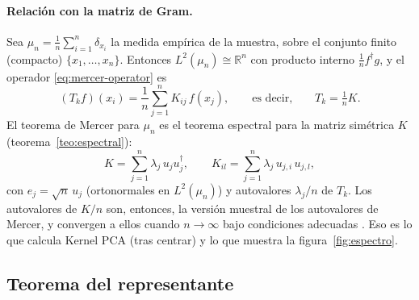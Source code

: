 \documentclass[11pt,a4paper]{article}
\newcommand{\R}{\mathbb{R}}
\newcommand{\dg}{\dagger}                         %
\theoremstyle{plain}
\theoremstyle{definition}
\theoremstyle{remark}
\numberwithin{equation}{section}
\begin{document}
\paragraph{Relación con la matriz de Gram.} Sea $\mu_n=\frac1n\sum_{i=1}^n\delta_{x_i}$ la
medida empírica de la muestra, sobre el conjunto finito (compacto) $\{x_1,\dots,x_n\}$.
Entonces $L^2(\mu_n)\cong\R^n$ con producto interno $\frac1n f^{\dg}g$, y el operador
\eqref{eq:mercer-operator} es
\begin{equation}\label{eq:empirical-operator}
  (T_kf)(x_i)=\frac1n\sum_{j=1}^nK_{ij}\,f(x_j),\qquad\text{es decir,}\qquad T_k=\tfrac1nK .
\end{equation}
El teorema de Mercer para $\mu_n$ es el teorema espectral para la matriz simétrica $K$
(teorema~\ref{teo:espectral}):
\begin{equation}\label{eq:gram-spectral}
  K=\sum_{j=1}^n\lambda_j\,u_ju_j^{\dg},\qquad
  K_{il}=\sum_{j=1}^n\lambda_j\,u_{j,i}\,u_{j,l},
\end{equation}
con $e_j=\sqrt n\,u_j$ (ortonormales en $L^2(\mu_n)$) y autovalores $\lambda_j/n$ de $T_k$.
Los autovalores de $K/n$ son, entonces, la versión muestral de los autovalores de Mercer, y
convergen a ellos cuando $n\to\infty$ bajo condiciones adecuadas \cite{koltchinskii2000}.
Eso es lo que calcula Kernel PCA (tras centrar) y lo que muestra la
figura~\ref{fig:espectro}.

\subsection{Teorema del representante}
\end{document}
